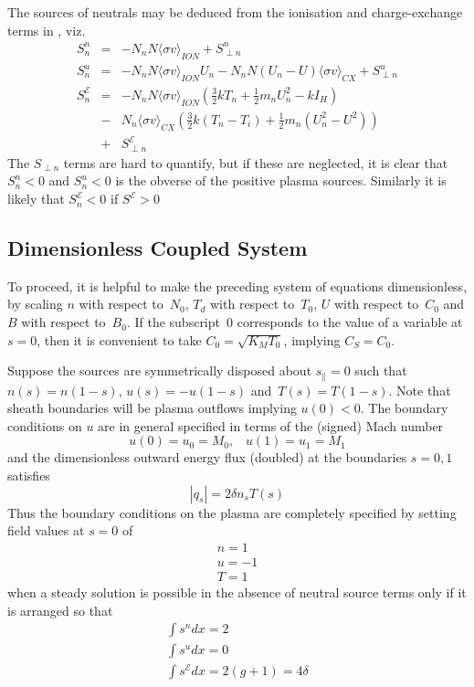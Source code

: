 The sources of neutrals may be deduced from the ionisation and charge-exchange terms in , viz.
\begin{eqnarray}
\label{eq:Snn} S^n_n&=&-N_n N \langle\sigma v\rangle_{ION} +S^n_{\perp n} \\
\label{eq:Sun} S^u_n&=&-N_n N \langle\sigma v\rangle_{ION} U_n - N_n N (U_n-U) \langle\sigma v\rangle_{CX} + S^u_{\perp n} \\
\label{eq:SEn} S^\mathcal{E}_n&=&
-N_n N \langle\sigma v\rangle_{ION} (\frac{3}{2} kT_n + \frac{1}{2} m_n U_n^2 -k I_H)\\
&-&N_n \langle\sigma v\rangle_{CX} \left(\frac{3}{2} k (T_n-T_i)  + \frac{1}{2} m_n (U_n^2-U^2)\right)\\
&+&S^\mathcal{E}_{\perp n} 
\end{eqnarray}
The $S_{\perp n}$ terms are hard to quantify, but if these are neglected,
it is clear that $S^n_n<0$ and $S^u_n<0$
is the obverse of the positive plasma sources. Similarly it is likely that $S^\mathcal{E}_n<0$ if $S^\mathcal{E}>0$

\subsection{Dimensionless Coupled System}\label{sec:sys23coupled}
To proceed, it is helpful to make the preceding system of equations dimensionless,
by scaling $n$ with respect to~$N_0$, $T_d$ with respect to~$T_0$,
$U$ with respect to~$C_0$ and $B$ with respect to~$B_0$.
If the subscript~$0$ corresponds to the value of a variable at $s=0$, then
it is convenient to take $C_0=\sqrt{K_M T_0}$, implying $C_S=C_0$.

Suppose the sources are symmetrically disposed about $s_{\|}=0$ such
that $n(s)=n(1-s)$, $u(s)=-u(1-s)$ and~$T(s)=T(1-s)$.
Note that sheath boundaries will be plasma outflows implying $u(0)<0$.
The boundary conditions on $u$ are in general specified in terms of the (signed) Mach number
\begin{equation}
u(0)=u_0= M_0,\;\;\; u(1)=u_1 = M_1
\end{equation}
and the dimensionless outward energy flux (doubled) at the boundaries $s=0,1$ satisfies
\begin{equation}\label{eq:Qp}
|q_s|=2 \delta n_s T(s)
\end{equation}
Thus the boundary conditions on the plasma are completely specified by
setting field values at $s=0$ of
\begin{eqnarray}
\label{eq:bcpdn} n=1 \\
\label{eq:bcpdu} u=-1 \\
\label{eq:bcpdt} T=1
\end{eqnarray}
when a steady solution is possible in the absence of neutral source terms only if it is arranged so that
\begin{eqnarray}
\label{eq:intsn} \int s^n dx = 2 \\
\label{eq:intsu} \int s^u dx = 0 \\
\label{eq:intst} \int s^{\mathcal{E}} dx = 2(g+1) = 4 \delta
\end{eqnarray}

